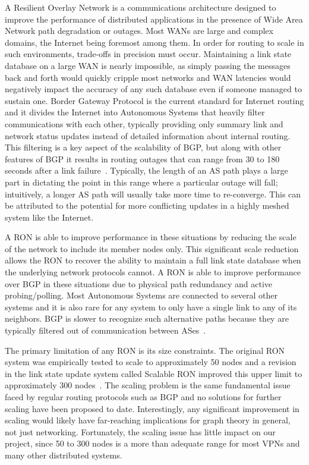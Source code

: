 A Resilient Overlay Network is a communications architecture designed to
improve the performance of distributed applications in the presence of Wide
Area Network path degradation or outages.  Most WANs are large and complex
domains, the Internet being foremost among them.  In order for routing to
scale in such environments, trade-offs in precision must occur.
Maintaining a link state database on a large WAN is nearly impossible, as
simply passing the messages back and forth would quickly cripple most
networks and WAN latencies would negatively impact the accuracy of any such
database even if someone managed to sustain one.  Border Gateway Protocol
is the current standard for Internet routing and it divides the Internet
into Autonomous Systems that heavily filter communications with each other,
typically providing only summary link and network status updates instead of
detailed information about internal routing.  This filtering is a key
aspect of the scalability of BGP, but along with other features of BGP it
results in routing outages that can range from 30 to 180 seconds after a
link failure~\cite{Andersen_2001}.  Typically, the length of an AS path
plays a large part in dictating the point in this range where a particular
outage will fall; intuitively, a longer AS path will usually take more
time to re-converge.  This can be attributed to the potential for more
conflicting updates in a highly meshed system like the Internet.

A RON is able to improve performance in these situations by reducing the
scale of the network to include its member nodes only.  This significant
scale reduction allows the RON to recover the ability to maintain a full
link state database when the underlying network protocols cannot.  A RON is
able to improve performance over BGP in these situations due to physical
path redundancy and active probing/polling.  Most Autonomous Systems are
connected to several other systems and it is also rare for any system to
only have a single link to any of its neighbors.  BGP is slower to
recognize such alternative paths because they are typically filtered out of
communication between ASes~\cite{Andersen_2001}.

The primary limitation of any RON is its size constraints.  The original
RON system was empirically tested to scale to approximately 50 nodes and a
revision in the link state update system called Scalable RON improved this
upper limit to approximately 300 nodes~\cite{Sontag_2009}.  The scaling
problem is the same fundamental issue faced by regular routing protocols
such as BGP and no solutions for further scaling have been proposed to
date.  Interestingly, any significant improvement in scaling would likely
have far-reaching implications for graph theory in general, not just
networking.  Fortunately, the scaling issue has little impact on our
project, since 50 to 300 nodes is a more than adequate range for most VPNs
and many other distributed systems.


